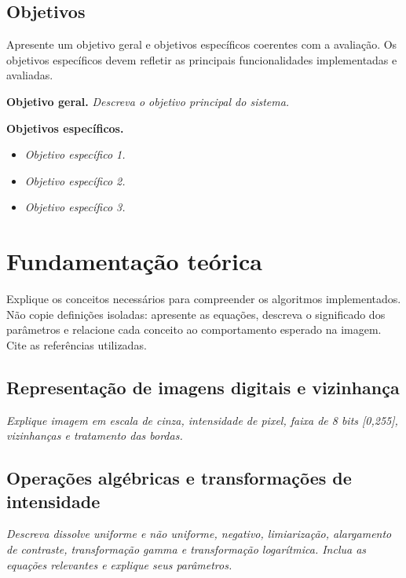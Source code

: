 \documentclass[11pt,a4paper]{article}
\newcommand{\placeholder}[1]{\textcolor{muted}{\textit{#1}}}
\begin{document}
\subsection{Objetivos}

\begin{orientacao}
Apresente um objetivo geral e objetivos específicos coerentes com a avaliação. Os objetivos específicos devem refletir as principais funcionalidades implementadas e avaliadas.
\end{orientacao}

\textbf{Objetivo geral.} \placeholder{Descreva o objetivo principal do sistema.}

\textbf{Objetivos específicos.}
\begin{itemize}
  \item \placeholder{Objetivo específico 1.}
  \item \placeholder{Objetivo específico 2.}
  \item \placeholder{Objetivo específico 3.}
\end{itemize}

\section{Fundamentação teórica}

\begin{orientacao}
Explique os conceitos necessários para compreender os algoritmos implementados. Não copie definições isoladas: apresente as equações, descreva o significado dos parâmetros e relacione cada conceito ao comportamento esperado na imagem. Cite as referências utilizadas.
\end{orientacao}

\subsection{Representação de imagens digitais e vizinhança}
\placeholder{Explique imagem em escala de cinza, intensidade de pixel, faixa de 8 bits [0,255], vizinhanças e tratamento das bordas.}

\subsection{Operações algébricas e transformações de intensidade}
\placeholder{Descreva dissolve uniforme e não uniforme, negativo, limiarização, alargamento de contraste, transformação gamma e transformação logarítmica. Inclua as equações relevantes e explique seus parâmetros.}
\end{document}
